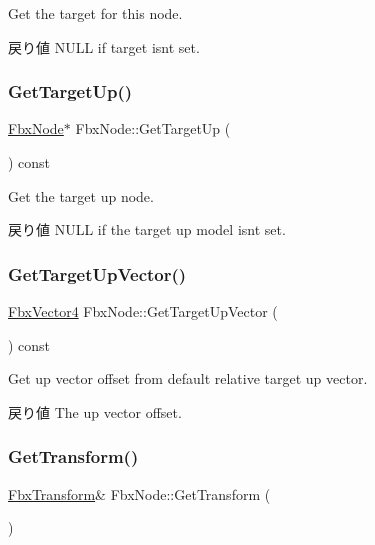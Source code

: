 Get the target for this node. \begin{DoxyReturn}{戻り値}
{\ttfamily N\+U\+LL} if target isn\textquotesingle{}t set. 
\end{DoxyReturn}
\mbox{\label{class_fbx_node_a06208ef541696ed4bfb38623cd23986f}} 
\subsubsection{\texorpdfstring{Get\+Target\+Up()}{GetTargetUp()}}
{\footnotesize\ttfamily \hyperlink{class_fbx_node}{Fbx\+Node}$\ast$ Fbx\+Node\+::\+Get\+Target\+Up (\begin{DoxyParamCaption}{ }\end{DoxyParamCaption}) const}

Get the target up node. \begin{DoxyReturn}{戻り値}
{\ttfamily N\+U\+LL} if the target up model isn\textquotesingle{}t set. 
\end{DoxyReturn}
\mbox{\label{class_fbx_node_a59fb630574cb61b0158495ab751f092e}} 
\subsubsection{\texorpdfstring{Get\+Target\+Up\+Vector()}{GetTargetUpVector()}}
{\footnotesize\ttfamily \hyperlink{class_fbx_vector4}{Fbx\+Vector4} Fbx\+Node\+::\+Get\+Target\+Up\+Vector (\begin{DoxyParamCaption}{ }\end{DoxyParamCaption}) const}

Get up vector offset from default relative target up vector. \begin{DoxyReturn}{戻り値}
The up vector offset. 
\end{DoxyReturn}
\mbox{\label{class_fbx_node_a3caaeba8d799dc3f78eecef204d17f4f}} 
\subsubsection{\texorpdfstring{Get\+Transform()}{GetTransform()}}
{\footnotesize\ttfamily \hyperlink{class_fbx_transform}{Fbx\+Transform}\& Fbx\+Node\+::\+Get\+Transform (\begin{DoxyParamCaption}{ }\end{DoxyParamCaption})}

